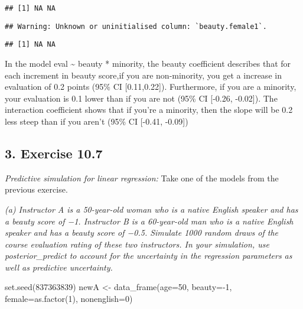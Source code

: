 \documentclass[
]{article}
\newenvironment{Shaded}{\begin{snugshade}}{\end{snugshade}}
\newcommand{\AttributeTok}[1]{\textcolor[rgb]{0.77,0.63,0.00}{#1}}
\newcommand{\DecValTok}[1]{\textcolor[rgb]{0.00,0.00,0.81}{#1}}
\newcommand{\FunctionTok}[1]{\textcolor[rgb]{0.00,0.00,0.00}{#1}}
\newcommand{\NormalTok}[1]{#1}
\newcommand{\OtherTok}[1]{\textcolor[rgb]{0.56,0.35,0.01}{#1}}
\newcommand{\SpecialCharTok}[1]{\textcolor[rgb]{0.00,0.00,0.00}{#1}}
\begin{document}
\begin{verbatim}
## [1] NA NA
\end{verbatim}

\begin{Shaded}
\end{Shaded}

\begin{verbatim}
## Warning: Unknown or uninitialised column: `beauty.female1`.
\end{verbatim}

\begin{verbatim}
## [1] NA NA
\end{verbatim}

In the model eval \textasciitilde{} beauty * minority, the beauty
coefficient describes that for each increment in beauty score,if you are
non-minority, you get a increase in evaluation of 0.2 points (95\% CI
{[}0.11,0.22{]}). Furthermore, if you are a minority, your evaluation is
0.1 lower than if you are not (95\% CI {[}-0.26, -0.02{]}). The
interaction coefficient shows that if you're a minority, then the slope
will be 0.2 less steep than if you aren't (95\% CI {[}-0.41, -0.09{]})

\hypertarget{exercise-10.7}{%
\subsection{3. Exercise 10.7}\label{exercise-10.7}}

\emph{Predictive simulation for linear regression:} Take one of the
models from the previous exercise.

\emph{(a) Instructor A is a 50-year-old woman who is a native English
speaker and has a beauty score of −1. Instructor B is a 60-year-old man
who is a native English speaker and has a beauty score of −0.5. Simulate
1000 random draws of the course evaluation rating of these two
instructors. In your simulation, use posterior\_predict to account for
the uncertainty in the regression parameters as well as predictive
uncertainty.}

\begin{Shaded}
\begin{Highlighting}[]
\FunctionTok{set.seed}\NormalTok{(}\DecValTok{837363839}\NormalTok{)}
\NormalTok{newA }\OtherTok{\textless{}{-}} \FunctionTok{data\_frame}\NormalTok{(}\AttributeTok{age=}\DecValTok{50}\NormalTok{, }\AttributeTok{beauty=}\SpecialCharTok{{-}}\DecValTok{1}\NormalTok{, }\AttributeTok{female=}\FunctionTok{as.factor}\NormalTok{(}\DecValTok{1}\NormalTok{), }\AttributeTok{nonenglish=}\DecValTok{0}\NormalTok{)}
\end{Highlighting}
\end{Shaded}
\end{document}
